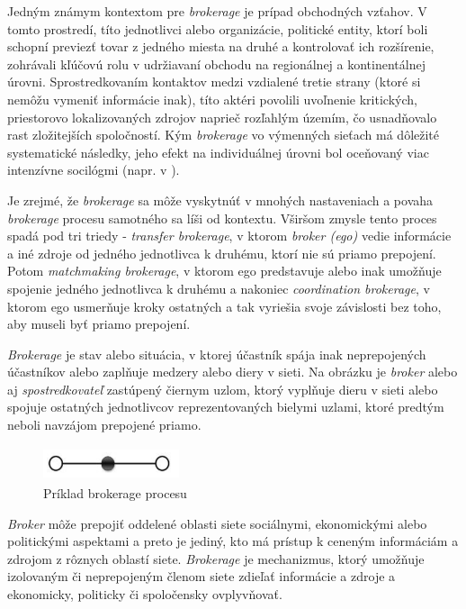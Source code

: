 \documentclass[slovak,master,public,dept460,male,cpdeclaration,oneside]{diploma}
\begin{document}
Jedným známym kontextom pre \textit{brokerage} je prípad obchodných vzťahov. V tomto prostredí, títo jednotlivci alebo organizácie, politické entity, ktorí boli schopní previezť tovar z jedného miesta na druhé a kontrolovať ich rozšírenie, zohrávali kľúčovú rolu v udržiavaní obchodu na regionálnej a kontinentálnej úrovni. Sprostredkovaním kontaktov medzi vzdialené tretie strany (ktoré si nemôžu vymeniť informácie inak), títo aktéri povolili uvoľnenie kritických, priestorovo lokalizovaných zdrojov naprieč rozľahlým územím, čo usnadňovalo rast zložitejších spoločností.  Kým \textit{brokerage} vo výmenných sieťach má dôležité systematické následky, jeho efekt na individuálnej úrovni bol oceňovaný viac intenzívne socilógmi (napr. v \cite{15} \cite{17} \cite{18}). 


Je zrejmé, že \textit{brokerage} sa môže vyskytnúť v mnohých nastaveniach a povaha \textit{brokerage} procesu samotného sa líši od kontextu. Vširšom zmysle tento proces spadá pod tri triedy - \textit{transfer brokerage}, v ktorom \textit{broker (ego)} vedie informácie a iné zdroje od jedného jednotlivca k druhému, ktorí nie sú priamo prepojení. Potom \textit{matchmaking brokerage}, v ktorom ego predstavuje alebo inak umožňuje spojenie jedného jednotlivca k druhému a nakoniec \textit{coordination brokerage}, v ktorom ego usmerňuje kroky ostatných a tak vyriešia svoje závislosti bez toho, aby museli byť priamo prepojení.


\textit{Brokerage} je stav alebo situácia, v ktorej účastník spája inak neprepojených účastníkov alebo zaplňuje medzery alebo diery v sieti. \cite{15} Na obrázku je \textit{broker} alebo aj \textit{spostredkovateľ} zastúpený čiernym uzlom, ktorý vyplňuje dieru v sieti alebo spojuje ostatných jednotlivcov reprezentovaných bielymi uzlami, ktoré predtým neboli navzájom prepojené priamo.

\begin{figure}[H]
\centering
\includegraphics[width=4cm, height=1cm]{figures/brokerage_example}
\caption{Príklad brokerage procesu}
\end{figure}

\textit{Broker} môže prepojiť oddelené oblasti siete sociálnymi, ekonomickými alebo politickými aspektami a preto je jediný, kto má prístup k ceneným informáciám a zdrojom z rôznych oblastí siete. \textit{Brokerage} je mechanizmus, ktorý umožňuje izolovaným či neprepojeným členom siete zdieľať informácie a zdroje a ekonomicky, politicky či spoločensky ovplyvňovať. \cite{16}
\end{document}
